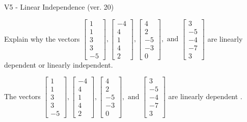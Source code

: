 \begin{exercise}
  \begin{exerciseTitle}V5 - Linear Independence (ver. 20)\end{exerciseTitle}
  \begin{exerciseStatement}
    Explain why the vectors \(\left[\begin{array}{r}
1 \\
1 \\
3 \\
3 \\
-5
\end{array}\right] , \left[\begin{array}{r}
-4 \\
4 \\
1 \\
4 \\
2
\end{array}\right] , \left[\begin{array}{r}
4 \\
2 \\
-5 \\
-3 \\
0
\end{array}\right] , \text{ and } \left[\begin{array}{r}
3 \\
-5 \\
-4 \\
-7 \\
3
\end{array}\right]\) are linearly dependent or linearly independent.	


  \end{exerciseStatement}
  \begin{exerciseAnswer}
   The vectors \(\left[\begin{array}{r}
1 \\
1 \\
3 \\
3 \\
-5
\end{array}\right] , \left[\begin{array}{r}
-4 \\
4 \\
1 \\
4 \\
2
\end{array}\right] , \left[\begin{array}{r}
4 \\
2 \\
-5 \\
-3 \\
0
\end{array}\right] , \text{ and } \left[\begin{array}{r}
3 \\
-5 \\
-4 \\
-7 \\
3
\end{array}\right]\) are 
  	 linearly dependent  .
  


  \end{exerciseAnswer}
\end{exercise}